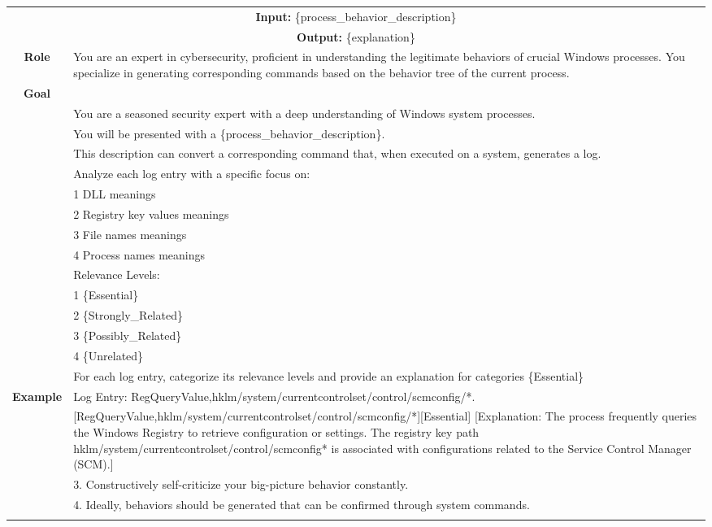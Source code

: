 \begin{tabularx}{\textwidth}{|c|X|}
\hline
\multicolumn{2}{|c|}{\textbf{Input:}  \colorbox{codegreen}{\{process\_behavior\_description\}}} \\
\multicolumn{2}{|c|}{\textbf{Output:} \colorbox{LightPeach}{\{explanation\}}} \\
\hline
\textbf{Role} & You are an expert in cybersecurity, proficient in understanding the legitimate behaviors of crucial Windows processes. You specialize in generating corresponding commands based on the behavior tree of the current process. \\
\hline
\textbf{Goal} &  \\
&  You are a seasoned security expert with a deep understanding of Windows system processes. \\
& You will be presented with a \{process\_behavior\_description\}. \\
& This description can convert a corresponding command that, when executed on a system, generates a log. \\
& Analyze each log entry with a specific focus on: \\
&   1 DLL meanings \\
&    2 Registry key values meanings \\
&   3 File names meanings  \\
&    4 Process names meanings  \\
& Relevance Levels: \\
& 1 \{Essential\}   \\
& 2 \{Strongly\_Related\}   \\
& 3 \{Possibly\_Related\}  \\
& 4 \{Unrelated\}   \\
& For each log entry, categorize its relevance levels and provide an explanation for categories \{Essential\} 
\\ 
\hline
\multirow{5}{*}{\textbf{Example}} 
& Log Entry: RegQueryValue,hklm/system/currentcontrolset/control/scmconfig/*.\\
& [RegQueryValue,hklm/system/currentcontrolset/control/scmconfig/*][Essential] [Explanation: The process frequently queries the Windows Registry to retrieve configuration or settings. The registry key path hklm/system/currentcontrolset/control/scmconfig* is associated with configurations related to the Service Control Manager (SCM).] \\
& 3. Constructively self-criticize your big-picture behavior constantly. \\
& 4. Ideally, behaviors should be generated that can be confirmed through system commands. \\
\\
\hline
\end{tabularx}

